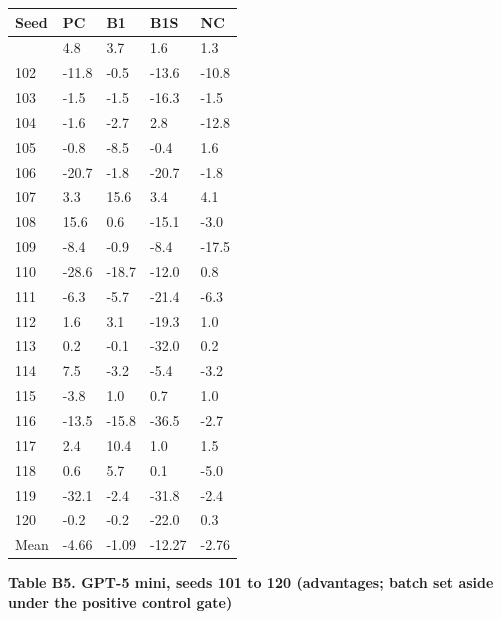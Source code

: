 \documentclass[11pt]{article}
\begin{document}
{\def\LTcaptype{none} %
\begin{longtable}[]{@{}lllll@{}}
\toprule\noalign{}
Seed & PC & B1 & B1S & NC \\
\midrule\noalign{}
\endhead
\bottomrule\noalign{}
\endlastfoot
101 & 4.8 & 3.7 & 1.6 & 1.3 \\
102 & -11.8 & -0.5 & -13.6 & -10.8 \\
103 & -1.5 & -1.5 & -16.3 & -1.5 \\
104 & -1.6 & -2.7 & 2.8 & -12.8 \\
105 & -0.8 & -8.5 & -0.4 & 1.6 \\
106 & -20.7 & -1.8 & -20.7 & -1.8 \\
107 & 3.3 & 15.6 & 3.4 & 4.1 \\
108 & 15.6 & 0.6 & -15.1 & -3.0 \\
109 & -8.4 & -0.9 & -8.4 & -17.5 \\
110 & -28.6 & -18.7 & -12.0 & 0.8 \\
111 & -6.3 & -5.7 & -21.4 & -6.3 \\
112 & 1.6 & 3.1 & -19.3 & 1.0 \\
113 & 0.2 & -0.1 & -32.0 & 0.2 \\
114 & 7.5 & -3.2 & -5.4 & -3.2 \\
115 & -3.8 & 1.0 & 0.7 & 1.0 \\
116 & -13.5 & -15.8 & -36.5 & -2.7 \\
117 & 2.4 & 10.4 & 1.0 & 1.5 \\
118 & 0.6 & 5.7 & 0.1 & -5.0 \\
119 & -32.1 & -2.4 & -31.8 & -2.4 \\
120 & -0.2 & -0.2 & -22.0 & 0.3 \\
Mean & -4.66 & -1.09 & -12.27 & -2.76 \\
\end{longtable}
}

\textbf{Table B5. GPT-5 mini, seeds 101 to 120 (advantages; batch set
aside under the positive control gate)}
\end{document}
